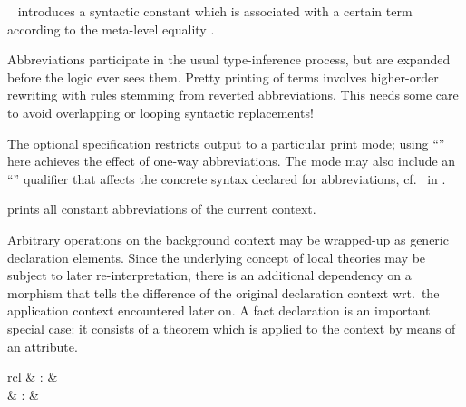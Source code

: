 \begin{isabellebody}
\begin{isamarkuptext}
\begin{description}
  \item \hyperlink{command.abbreviation}{\mbox{}}~ introduces a
  syntactic constant which is associated with a certain term according
  to the meta-level equality .
  
  Abbreviations participate in the usual type-inference process, but
  are expanded before the logic ever sees them.  Pretty printing of
  terms involves higher-order rewriting with rules stemming from
  reverted abbreviations.  This needs some care to avoid overlapping
  or looping syntactic replacements!
  
  The optional  specification restricts output to a
  particular print mode; using ``'' here achieves the
  effect of one-way abbreviations.  The mode may also include an
  ``\hyperlink{keyword.output}{\mbox{}}'' qualifier that affects the concrete syntax
  declared for abbreviations, cf.\ \hyperlink{command.syntax}{\mbox{}} in
  .
  
  \item \hyperlink{command.print-abbrevs}{\mbox{}} prints all constant abbreviations
  of the current context.
  
  \end{description}%
\end{isamarkuptext}%
\isamarkuptrue%
%
\isamarkuptrue%
%
\begin{isamarkuptext}%
Arbitrary operations on the background context may be wrapped-up as
  generic declaration elements.  Since the underlying concept of local
  theories may be subject to later re-interpretation, there is an
  additional dependency on a morphism that tells the difference of the
  original declaration context wrt.\ the application context
  encountered later on.  A fact declaration is an important special
  case: it consists of a theorem which is applied to the context by
  means of an attribute.

  \begin{matharray}{rcl}
    \hypertarget{command.declaration}{\hyperlink{command.declaration}{\mbox{}}} & : &  \\
    \hypertarget{command.declare}{\hyperlink{command.declare}{\mbox{}}} & : &  \\
  \end{matharray}


\end{isamarkuptext}
\end{isabellebody}
